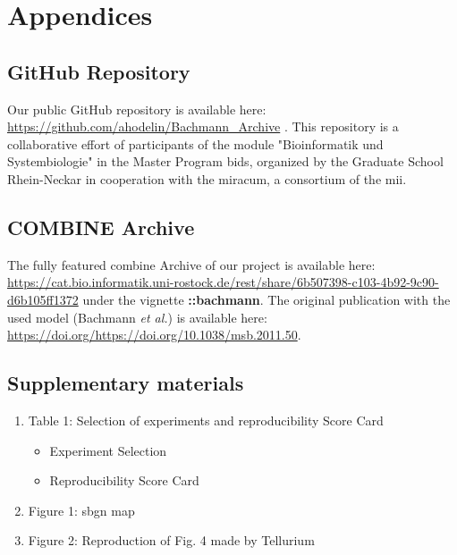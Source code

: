 \newpage
\section*{Appendices}

\subsection*{GitHub Repository} \label{git}

Our public GitHub repository is available here: \url{https://github.com/ahodelin/Bachmann_Archive} \cite{AbelHodelinHernandez.2021}.
This repository is a collaborative effort of participants of the module "Bioinformatik und Systembiologie" in the Master Program \ac{bids}, organized by the Graduate School Rhein-Neckar in cooperation with the \ac{miracum}, a consortium of the \ac{mii}.

\subsection*{COMBINE Archive}

The fully featured \ac{combine} Archive of our project is available here: \url{https://cat.bio.informatik.uni-rostock.de/rest/share/6b507398-c103-4b92-9c90-d6b105ff1372} under the vignette  \textbf{::bachmann}. The original publication with the used model (Bachmann \textit{et al.}) is available here: \url{https://doi.org/https://doi.org/10.1038/msb.2011.50}.

\subsection*{Supplementary materials}
\begin{enumerate}
    \item Table 1: Selection of experiments and reproducibility Score Card
    \begin{itemize}
        \item Experiment Selection
        \item Reproducibility Score Card
    \end{itemize}
    \item Figure 1: \ac{sbgn} map 
    \item Figure 2: Reproduction of Fig. 4 made by Tellurium
\end{enumerate}